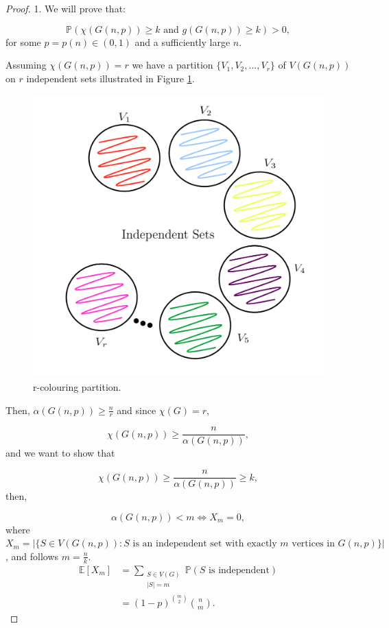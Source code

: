 \documentclass[12pt,twoside,a4paper,bibliography=totocnumbered]{book}
\numberwithin{equation}{section}
\theoremstyle{remark}
\begin{document}
\begin{proof} 1.
We will prove that:

$$\mathbb{P}(\chi(G(n,p)) \geq k \text{ and } g(G(n,p)) \geq k) > 0 ,$$
for some $p =p(n) \in (0,1)$ and a sufficiently large $n$.

Assuming $\chi(G(n,p)) = r$ we have a partition $\{V_1,V_2,...,V_r\}$ of $V(G(n,p))$ on $r$ independent sets illustrated in Figure \ref{fig:r-partition}.
 
\begin{figure}[!htb]
     \centering
     \includegraphics[scale=1]{Figuras/r-partion.jpg}
     \caption{r-colouring partition. }
     \label{fig:r-partition}
\end{figure}

Then, $\alpha (G(n,p)) \geq \frac{n}{r}$ and since $\chi(G)=r$,

$$\chi(G(n,p)) \geq \frac{n}{\alpha(G(n,p))},$$
and we want to show that

$$\chi(G(n,p)) \geq \frac{n}{\alpha(G(n,p))} \geq k ,$$
then,

$$\alpha(G(n,p)) < m \iff X_m=0 ,$$
where 
$X_m = \big|\{S\in V(G(n,p))\colon \text{$S$ is an independent set with exactly $m$ vertices in $G(n,p)$}\}\big|$,
and follows $m = \frac{n}{k}$. 
\begin{align*}
\mathbb{E}[X_m]&=\sum_{\substack{S \in V(G) \\ |S| = m}} \mathbb{P}(S\text{ is independent})\\
&=(1-p)^{\binom{m}{2}} \binom{n}{m}.
\end{align*}


\end{proof}
\end{document}
